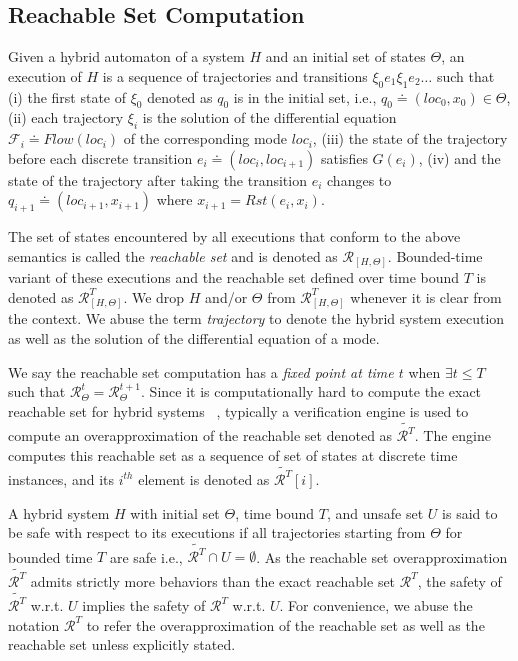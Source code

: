 \subsection{Reachable Set Computation}

\begin{definition}

Given a hybrid automaton of a system $H$ and an initial set of states $\Theta$, an execution of $H$ is a sequence of trajectories and transitions $\xi_0 e_1 \xi_1 e_2 \ldots $ such that
%
(i) the first state of $\xi_0$ denoted as $q_0$ is in the initial set, i.e., $q_0 \doteq (loc_0, x_0)\in \Theta$,
%
(ii) each trajectory $\xi_i$ is the solution of the differential equation $\mathcal{F}_i \doteq Flow (loc_i)$ of the corresponding mode $loc_i$, 
%
(iii) the state of the trajectory before each discrete transition $e_i \doteq (loc_i, loc_{i+1})$ satisfies $G(e_i)$,
%
(iv) and the state of the trajectory after taking the transition $e_i$ changes to $q_{i+1} \doteq (loc_{i+1}, x_{i+1})$ where $x_{i+1} = Rst (e_i, x_i)$.
\end{definition}
%
The set of states encountered by all executions that conform to the above semantics is called the \emph{reachable set} and is denoted as $\mathcal{R}_{[H, \Theta]}$. Bounded-time variant of these executions and the reachable set defined over time bound $T$ is denoted as $\mathcal{R}_{[H, \Theta]}^T$. We drop $H$ and/or $\Theta$ from $\mathcal{R}_{[H, \Theta]}^T$ whenever it is clear from the context. We abuse the term \emph{trajectory} to denote the hybrid system execution as well as the solution of the differential equation of a mode.

We say the reachable set computation has a \emph{fixed point at time $t$} when $\exists t \leq T$ such that $\mathcal{R}_{\Theta}^t = \mathcal{R}_{\Theta}^{t+1}$.
Since it is computationally hard to compute the exact reachable set for hybrid systems ~\cite{ALUR19953,10.1007/3-540-46430-1_6}, typically a verification engine is used to compute an overapproximation of the reachable set denoted as $\tilde{\mathcal{R}^T}$. The engine computes this reachable set as a sequence of set of states at discrete time instances, and its  $i^{th}$ element is denoted as $\tilde{\mathcal{R}^T}[i]$.

\vspace{0.2cm}
\begin{definition}
\label{def:hybridSafe}
A hybrid system $H$ with initial set $\Theta$, time bound $T$, and unsafe set $U$ is said to be safe with respect to its executions if all trajectories starting from $\Theta$ for bounded time $T$ are safe i.e., $\tilde{\mathcal{R}^T} \cap U = \emptyset$. As the reachable set overapproximation $\tilde{\mathcal{R}^T}$ admits strictly more behaviors than the exact reachable set $\mathcal{R}^T$, the  safety of $\tilde{\mathcal{R}^T}$ w.r.t. $U$ implies the safety of $\mathcal{R}^T$ w.r.t. $U$. For convenience, we abuse the notation $\mathcal{R}^T$ to refer the overapproximation of the reachable set as well as the reachable set unless explicitly stated.
\end{definition}

